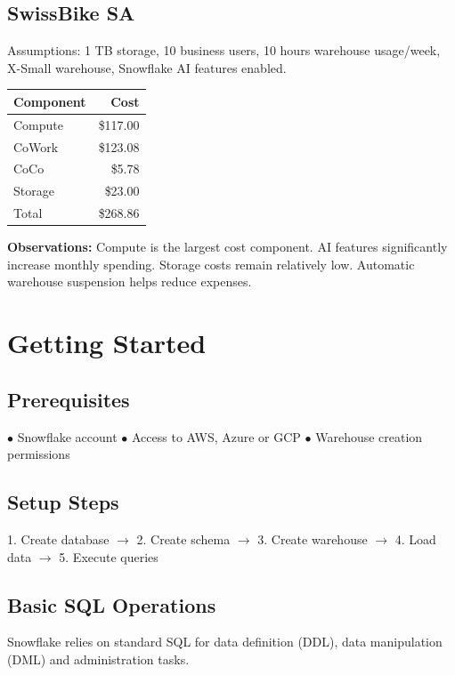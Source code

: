 \documentclass[9pt,a4paper]{article}
\begin{document}
\subsection{SwissBike SA}

Assumptions: 1 TB storage, 10 business users, 10 hours warehouse usage/week, X-Small warehouse, Snowflake AI features enabled.

\begin{center}
\begin{tabular}{lr}
\toprule
Component & Cost \\
\midrule
Compute & \$117.00 \\
CoWork & \$123.08 \\
CoCo & \$5.78 \\
Storage & \$23.00 \\
\midrule
Total & \$268.86 \\
\bottomrule
\end{tabular}
\end{center}

\textbf{Observations:} Compute is the largest cost component. AI features significantly increase monthly spending. Storage costs remain relatively low. Automatic warehouse suspension helps reduce expenses.

\section{Getting Started}

\subsection{Prerequisites}

$\bullet$ Snowflake account \quad
$\bullet$ Access to AWS, Azure or GCP \quad
$\bullet$ Warehouse creation permissions

\subsection{Setup Steps}

1. Create database $\rightarrow$
2. Create schema $\rightarrow$
3. Create warehouse $\rightarrow$
4. Load data $\rightarrow$
5. Execute queries

\subsection{Basic SQL Operations}

Snowflake relies on standard SQL for data definition (DDL), data manipulation (DML) and administration tasks.
\end{document}
